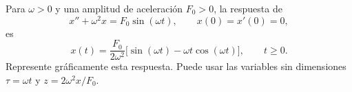 Para \(\omega>0\) y una amplitud de aceleración \(F_0>0\), la respuesta de
\[x''+\omega^2x=F_0\sin(\omega t),\qquad x(0)=x'(0)=0,\]
es
\[x(t)=\frac{F_0}{2\omega^2}\big[\sin(\omega t)-\omega t\cos(\omega t)\big],\qquad t\ge0.\]
Represente gráficamente esta respuesta. Puede usar las variables sin dimensiones \(\tau=\omega t\) y \(z=2\omega^2x/F_0\).
